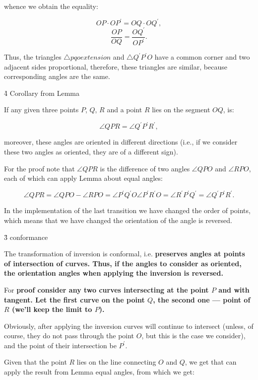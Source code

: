 whence we obtain the equality:

$$ OP \cdot OP^\prime = OQ \cdot OQ^\prime, $$
$$ \frac{ OP }{ OQ } = \frac{ OQ^\prime }{ OP^\prime }. $$

Thus, the triangles $\triangle pqo extension$ and $\triangle Q^\prime P^\prime O$ have a common corner and two adjacent sides proportional, therefore, these triangles are similar, because corresponding angles are the same.

\h4{ Corollary from Lemma }

If any given three points $P$, $Q$, $R$ and a point $R$ lies on the segment $OQ$, is:

$$ \angle QPR = \angle Q^\prime P^\prime R^\prime, $$

moreover, these angles are oriented in different directions (i.e., if we consider these two angles as oriented, they are of a different sign).


For the proof note that $\angle QPR$ is the difference of two angles $\angle QPO$ and $\angle RPO$, each of which can apply Lemma about equal angles:

$$ \angle QPR = \angle QPO - \angle RPO = \angle P^\prime Q^\prime O \angle P^\prime R^\prime O = \angle R^\prime P^\prime Q^\prime = \angle Q^\prime P^\prime R^\prime. $$

In the implementation of the last transition we have changed the order of points, which means that we have changed the orientation of the angle is reversed.


\h3{ conformance }

The transformation of inversion is conformal, i.e. \bf{preserves angles at points of intersection of curves}. Thus, if the angles to consider as oriented, the orientation angles when applying the inversion is reversed.


For \bf{proof} consider any two curves intersecting at the point $P$ and with tangent. Let the first curve on the point $Q$, the second one --- point of $R$ (we'll keep the limit to $P$).

Obviously, after applying the inversion curves will continue to intersect (unless, of course, they do not pass through the point $O$, but this is the case we consider), and the point of their intersection be $P^\prime$.

Given that the point $R$ lies on the line connecting $O$ and $Q$, we get that can apply the result from Lemma equal angles, from which we get:

